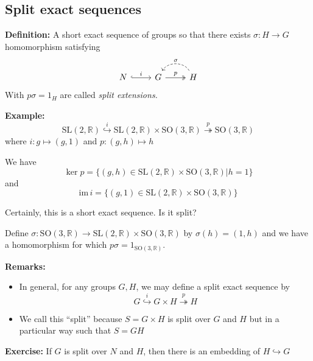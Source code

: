 \documentclass[12pt]{article}
\newcommand{\R}{\mathbb{R}}
\newcommand{\SL}{\text{SL}}
\newcommand{\SO}{\text{SO}}
\newcommand{\im}{\text{im}\,}
\begin{document}
\subsection*{Split exact sequences}
    \textbf{Definition:} A short exact sequence of groups so that there exists $\sigma: H \to G$ homomorphism satisfying 
    \[\begin{tikzcd}
        N \arrow[hook]{r}{i} & G \arrow[two heads]{r}{p} & H \arrow[swap, dashed, bend right=60]{l}{\sigma} 
    \end{tikzcd}\]
    With $p\sigma = 1_H$ are called \emph{split extensions.} 

    \textbf{Example:} 
    \[\SL(2, \R) \overset{i}{\hookrightarrow} \SL(2, \R) \times \SO(3, \R) \overset{p}{\twoheadrightarrow} \SO(3, \R)\] 
    where $i: g \mapsto (g, 1)$ and $p: (g, h) \mapsto h$ 

    We have 
    \[\ker p = \{(g, h) \in \SL(2, \R) \times \SO(3, \R) \big\vert h = 1\}\]
    and 
    \[\im i = \{(g, 1) \in \SL(2, \R) \times \SO(3, \R)\}\]

    Certainly, this is a short exact sequence. Is it split? 

    Define $\sigma: \SO(3, \R) \to \SL(2, \R) \times \SO(3, \R)$ by $\sigma(h) = (1, h)$ and we have a homomorphism for which $p\sigma = 1_{\SO(3, \R)}$.

    \textbf{Remarks:} 
    \begin{itemize}
        \item In general, for any groups $G, H$, we may define a split exact sequence by 
        \[G \overset{i}{\hookrightarrow} G \times H \overset{p}{\twoheadrightarrow} H\] 

        \item We call this ``split'' because $S = G \times H$ is split over $G$ and $H$ but in a particular way such that $S = GH$         
    \end{itemize}

    \textbf{Exercise:} If $G$ is split over $N$ and $H$, then there is an embedding of $H \hookrightarrow G$ 
\end{document}
